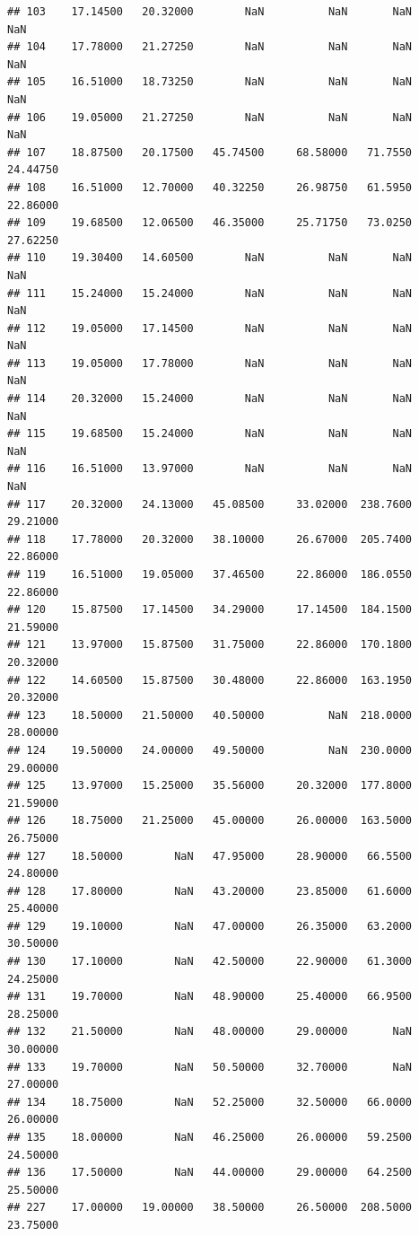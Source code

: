 \documentclass[]{article}
\begin{document}
\begin{verbatim}
## 103    17.14500   20.32000        NaN          NaN       NaN         NaN
## 104    17.78000   21.27250        NaN          NaN       NaN         NaN
## 105    16.51000   18.73250        NaN          NaN       NaN         NaN
## 106    19.05000   21.27250        NaN          NaN       NaN         NaN
## 107    18.87500   20.17500   45.74500     68.58000   71.7550    24.44750
## 108    16.51000   12.70000   40.32250     26.98750   61.5950    22.86000
## 109    19.68500   12.06500   46.35000     25.71750   73.0250    27.62250
## 110    19.30400   14.60500        NaN          NaN       NaN         NaN
## 111    15.24000   15.24000        NaN          NaN       NaN         NaN
## 112    19.05000   17.14500        NaN          NaN       NaN         NaN
## 113    19.05000   17.78000        NaN          NaN       NaN         NaN
## 114    20.32000   15.24000        NaN          NaN       NaN         NaN
## 115    19.68500   15.24000        NaN          NaN       NaN         NaN
## 116    16.51000   13.97000        NaN          NaN       NaN         NaN
## 117    20.32000   24.13000   45.08500     33.02000  238.7600    29.21000
## 118    17.78000   20.32000   38.10000     26.67000  205.7400    22.86000
## 119    16.51000   19.05000   37.46500     22.86000  186.0550    22.86000
## 120    15.87500   17.14500   34.29000     17.14500  184.1500    21.59000
## 121    13.97000   15.87500   31.75000     22.86000  170.1800    20.32000
## 122    14.60500   15.87500   30.48000     22.86000  163.1950    20.32000
## 123    18.50000   21.50000   40.50000          NaN  218.0000    28.00000
## 124    19.50000   24.00000   49.50000          NaN  230.0000    29.00000
## 125    13.97000   15.25000   35.56000     20.32000  177.8000    21.59000
## 126    18.75000   21.25000   45.00000     26.00000  163.5000    26.75000
## 127    18.50000        NaN   47.95000     28.90000   66.5500    24.80000
## 128    17.80000        NaN   43.20000     23.85000   61.6000    25.40000
## 129    19.10000        NaN   47.00000     26.35000   63.2000    30.50000
## 130    17.10000        NaN   42.50000     22.90000   61.3000    24.25000
## 131    19.70000        NaN   48.90000     25.40000   66.9500    28.25000
## 132    21.50000        NaN   48.00000     29.00000       NaN    30.00000
## 133    19.70000        NaN   50.50000     32.70000       NaN    27.00000
## 134    18.75000        NaN   52.25000     32.50000   66.0000    26.00000
## 135    18.00000        NaN   46.25000     26.00000   59.2500    24.50000
## 136    17.50000        NaN   44.00000     29.00000   64.2500    25.50000
## 227    17.00000   19.00000   38.50000     26.50000  208.5000    23.75000

\end{verbatim}
\end{document}
